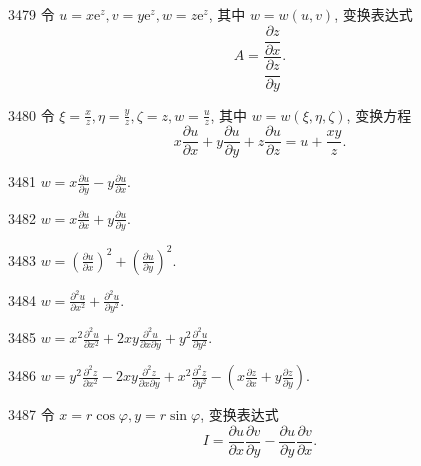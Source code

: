 \begin{prob}[M]{3479}
令 $u = x\mathrm{e}^z, v = y\mathrm{e}^z, w = z\mathrm{e}^z$, 其中 $w = w(u, v)$, 变换表达式
\[
A = \frac{\dfrac{\partial z}{\partial x}}{\dfrac{\partial z}{\partial y}}.
\]
\end{prob}

\begin{prob}[M]{3480}
令 $\xi = \frac{x}{z}, \eta = \frac{y}{z}, \zeta = z, w = \frac{u}{z}$, 其中 $w = w(\xi, \eta, \zeta)$, 变换方程
\[
x\frac{\partial u}{\partial x} + y\frac{\partial u}{\partial y} + z\frac{\partial u}{\partial z} = u + \frac{xy}{z}.
\]
\end{prob}


\begin{prob}[S]{3481}
$w = x\frac{\partial u}{\partial y} - y\frac{\partial u}{\partial x}$.
\end{prob}

\begin{prob}[S]{3482}
$w = x\frac{\partial u}{\partial x} + y\frac{\partial u}{\partial y}$.
\end{prob}

\begin{prob}[S]{3483}
$w = \left(\frac{\partial u}{\partial x}\right)^2 + \left(\frac{\partial u}{\partial y}\right)^2$.
\end{prob}

\begin{prob}[S]{3484}
$w = \frac{\partial^2 u}{\partial x^2} + \frac{\partial^2 u}{\partial y^2}$.
\end{prob}

\begin{prob}[S]{3485}
$w = x^2\frac{\partial^2 u}{\partial x^2} + 2xy\frac{\partial^2 u}{\partial x\partial y} + y^2\frac{\partial^2 u}{\partial y^2}$.
\end{prob}

\begin{prob}[S]{3486}
$w = y^2\frac{\partial^2 z}{\partial x^2} - 2xy\frac{\partial^2 z}{\partial x\partial y} + x^2\frac{\partial^2 z}{\partial y^2} - \left(x\frac{\partial z}{\partial x} + y\frac{\partial z}{\partial y}\right)$.
\end{prob}

\begin{prob}[M]{3487}
令 $x = r\cos\varphi, y = r\sin\varphi$, 变换表达式
\[
I = \frac{\partial u}{\partial x}\frac{\partial v}{\partial y} - \frac{\partial u}{\partial y}\frac{\partial v}{\partial x}.
\]
\end{prob}

